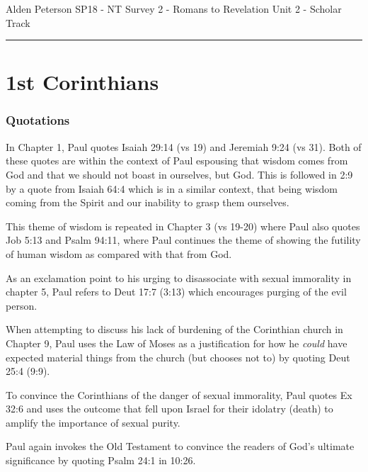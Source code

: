 \documentclass[12pt]{turabian-researchpaper}
\begin{document}
\begin{singlespace}
\noindent Alden Peterson \newline
\noindent SP18 - NT Survey 2 - Romans to Revelation\newline
\noindent Unit 2 - Scholar Track\newline
\noindent\rule{4cm}{0.4pt}
\end{singlespace}






\section{1st Corinthians}

\subsubsection{Quotations}
In Chapter 1, Paul quotes Isaiah 29:14 (vs 19) and Jeremiah 9:24 (vs 31).  Both of these quotes are within the context of Paul espousing that wisdom comes from God and that we should not boast in ourselves, but God. This is followed in 2:9 by a quote from Isaiah 64:4 which is in a similar context, that being wisdom coming from the Spirit and our inability to grasp them ourselves.

This theme of wisdom is repeated in Chapter 3 (vs 19-20) where Paul also quotes Job 5:13 and Psalm 94:11, where Paul continues the theme of showing the futility of human wisdom as compared with that from God.

As an exclamation point to his urging to disassociate with sexual immorality in chapter 5, Paul refers to Deut 17:7 (3:13) which encourages purging of the evil person.

When attempting to discuss his lack of burdening of the Corinthian church in Chapter 9, Paul uses the Law of Moses as a justification for how he \textit{could} have expected material things from the church (but chooses not to) by quoting Deut 25:4 (9:9).

To convince the Corinthians of the danger of sexual immorality, Paul quotes Ex 32:6 and uses the outcome that fell upon Israel for their idolatry (death) to amplify the importance of sexual purity.

Paul again invokes the Old Testament to convince the readers of God's ultimate significance by quoting Psalm 24:1 in 10:26.
\end{document}
